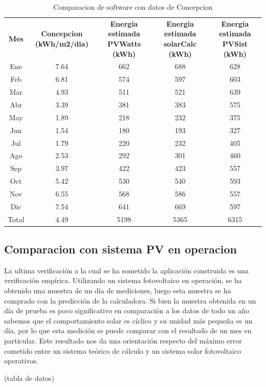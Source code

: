 \begin{table}[h!]
\caption{Comparacion de software con datos de Concepcion}
\begin{tabular}{|c|c|c|c|c|}
        \hline
	\textbf{Mes}&\textbf{Concepcion (kWh/m2/dia)}&\textbf{Energia estimada PVWatts (kWh)}&\textbf{Energia estimada solarCalc (kWh)}&\textbf{Energia estimada PVSist (kWh)}\\
	Ene&	7.64&	662&	688&	628\\
        \hline
	Feb&	6.81&	574&	597&	603\\
        \hline
	Mar&	4.93&	511&	521&	639\\
        \hline
	Abr&	3.39&	381&	383&	575\\
        \hline
	May&	1.89&	218&	232&	375\\
        \hline
	Jun&	1.54&	180&	193&	327\\
        \hline
	Jul&	1.79&	220&	232&	405\\
        \hline
	Ago&	2.53&	292&	301&	460\\
        \hline
	Sep&	3.97&	422&	423&	557\\
        \hline
	Oct&	5.42&	530&	540&	593\\
        \hline
	Nov&	6.55&	568&	586&	557\\
        \hline
	Dic&	7.54&	641&	669&	597\\
        \hline
	Total&	4.49&	5198&	5365&	6315\\
        \hline
\end{tabular}
\end{table}

\subsection{Comparacion con sistema PV en operacion}
La ultima verificación a la cual se ha sometido la aplicación construida es una verificación empírica. Utilizando un sistema fotovoltaico en operación, se ha obtenido una muestra de un día de mediciones, luego esta muestra se ha comprado con la predicción de la calculadora. Si bien la muestra obtenida en un día de prueba es poco significativo en comparación a los datos de todo un año sabemos que el comportamiento solar es cíclico y su unidad más pequeña es un día, por lo que esta medición se puede comparar con el resultado de un mes en particular. Este resultado nos da una orientación respecto del máximo error cometido entre un sistema teórico de cálculo y un sistema solar fotovoltaico operativos.

(tabla de datos)

